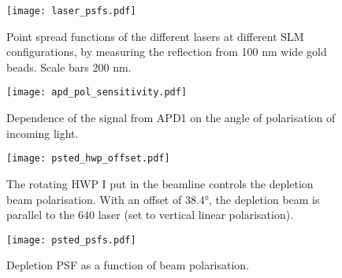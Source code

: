 \begin{figure}
	\centering
	\texttt{[image: laser\_psfs.pdf]}
	\caption{
		Point spread functions of the different lasers at different SLM configurations, by measuring the reflection from 100 nm wide gold beads. Scale bars 200 nm. 
	}
	\label{fig:normal psfs}
\end{figure}

\begin{figure}
	\centering
	\texttt{[image: apd\_pol\_sensitivity.pdf]}
	\caption{Dependence of the signal from APD1 on the angle of polarisation of incoming light.}
	\label{fig:apd pol sensitivity}
\end{figure}


\begin{figure}
	\centering
	\texttt{[image: psted\_hwp\_offset.pdf]}
	\caption{
		The rotating HWP I put in the beamline controls the depletion beam polarisation. With an offset of 38.4°, the depletion beam is parallel to the 640 laser (set to vertical linear polarisation).
	}
	\label{fig:psted hwp offset}
\end{figure}

\begin{figure}
	\centering
	\texttt{[image: psted\_psfs.pdf]}
	\caption{
		Depletion PSF as a function of beam polarisation. 
	}
	\label{fig:psted psfs}
\end{figure}